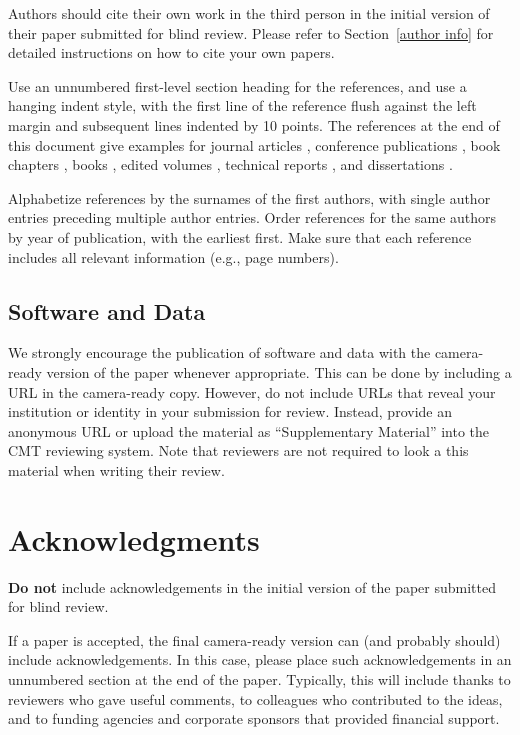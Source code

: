 \documentclass{article}
\begin{document}
Authors should cite their own work in the third person
in the initial version of their paper submitted for blind review.
Please refer to Section~\ref{author info} for detailed instructions on how to
cite your own papers.

Use an unnumbered first-level section heading for the references, and 
use a hanging indent style, with the first line of the reference flush
against the left margin and subsequent lines indented by 10 points. 
The references at the end of this document give examples for journal
articles \cite{Samuel59}, conference publications \cite{langley00}, book chapters \cite{Newell81}, books \cite{DudaHart2nd}, edited volumes \cite{MachineLearningI}, 
technical reports \cite{mitchell80}, and dissertations \cite{kearns89}. 

Alphabetize references by the surnames of the first authors, with
single author entries preceding multiple author entries. Order
references for the same authors by year of publication, with the
earliest first. Make sure that each reference includes all relevant
information (e.g., page numbers).

\subsection{Software and Data}

We strongly encourage the publication of software and data with the
camera-ready version of the paper whenever appropriate.  This can be
done by including a URL in the camera-ready copy.  However, do not
include URLs that reveal your institution or identity in your
submission for review.  Instead, provide an anonymous URL or upload
the material as ``Supplementary Material'' into the CMT reviewing
system.  Note that reviewers are not required to look a this material
when writing their review.


\section*{Acknowledgments} 
 
\textbf{Do not} include acknowledgements in the initial version of
the paper submitted for blind review.

If a paper is accepted, the final camera-ready version can (and
probably should) include acknowledgements. In this case, please
place such acknowledgements in an unnumbered section at the
end of the paper. Typically, this will include thanks to reviewers
who gave useful comments, to colleagues who contributed to the ideas, 
and to funding agencies and corporate sponsors that provided financial 
support.  


\nocite{langley00}



\end{document}
